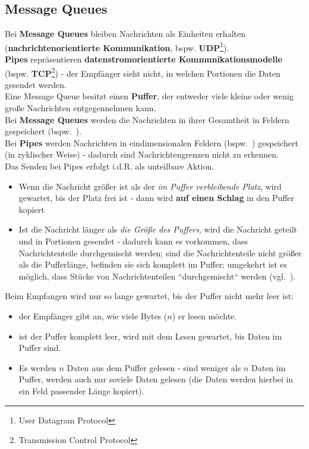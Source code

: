 \subsection{Message Queues}\label{sec:messagequeues}


Bei \textbf{Message Queues} bleiben Nachrichten als Einheiten erhalten (\textbf{nachrichtenorientierte Kommunikation}, bspw. \textbf{UDP}\footnote{User Datagram Protocol}).\\

\noindent
\textbf{Pipes} repräsentieren \textbf{datenstromorientierte Kommunikationsmodelle} (bspw. \textbf{TCP}\footnote{Transmission Control Protocol})  - der Empfänger sieht nicht, in welchen Portionen die Daten gesendet werden.\\

\noindent
Eine Message Queue besitzt einen \textbf{Puffer}, der entweder viele kleine oder wenig große Nachrichten entgegennehmen kann.\\

\noindent
Bei \textbf{Message Queues} werden die Nachrichten in ihrer Gesamtheit in Feldern gespeichert (bspw.~).\\

\noindent
Bei \textbf{Pipes} werden Nachrichten in eindimensionalen Feldern (bspw.~) gespeichert (in zyklischer Weise) - dadurch sind Nachrichtengrenzen nicht zu erkennen.\\

\noindent
Das Senden bei Pipes erfolgt i.d.R. als unteilbare Aktion.
\begin{itemize}
    \item Wenn die Nachricht größer ist als der \textit{im Puffer verbleibende Platz}, wird gewartet, bis der Platz frei ist - dann wird \textbf{auf einen Schlag} in den Puffer kopiert
    \item Ist die Nachricht länger als \textit{die Größe des Puffers}, wird die Nachricht geteilt und in Portionen gesendet - dadurch kann es vorkommen, dass Nachrichtenteile durchgemischt werden; sind die Nachrichtenteile nicht größer als die Pufferlänge, befinden sie sich komplett im Puffer;  umgekehrt ist es möglich, dass Stücke von Nachrichtenteilen ``durchgemischt`` werden (vgl.~\cite[117 f.]{Oec22}).
\end{itemize}

Beim Empfangen wird nur so lange gewartet, bis der Puffer nicht mehr leer ist:
\begin{itemize}
    \item der Empfänger gibt an, wie viele Bytes ($n$) er lesen möchte.
    \item ist der Puffer komplett leer, wird mit dem Lesen gewartet, bis Daten im Puffer sind.
    \item Es werden $n$ Daten aus dem Puffer gelesen - sind weniger als $n$ Daten im Puffer, werden auch nur soviele Daten gelesen (die Daten werden hierbei in ein Feld passender Länge kopiert).
\end{itemize}

